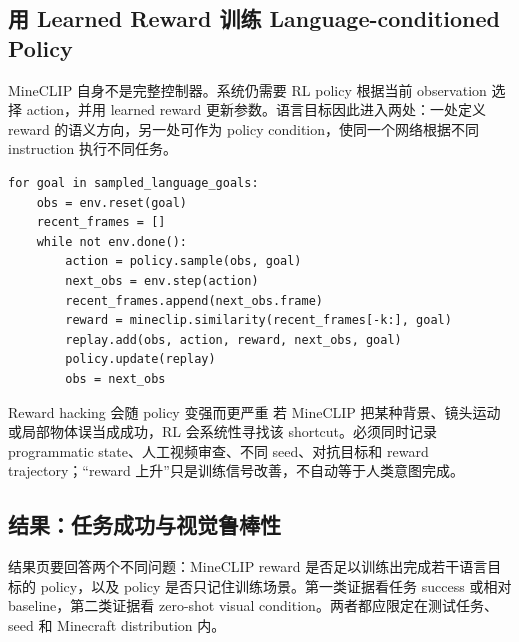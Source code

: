 \subsection{用 Learned Reward 训练 Language-conditioned Policy}

MineCLIP 自身不是完整控制器。系统仍需要 RL policy 根据当前 observation 选择 action，并用 learned reward 更新参数。语言目标因此进入两处：一处定义 reward 的语义方向，另一处可作为 policy condition，使同一个网络根据不同 instruction 执行不同任务。


\begin{lstlisting}[caption={MineCLIP-conditioned RL 训练循环的概念伪代码}]
for goal in sampled_language_goals:
    obs = env.reset(goal)
    recent_frames = []
    while not env.done():
        action = policy.sample(obs, goal)
        next_obs = env.step(action)
        recent_frames.append(next_obs.frame)
        reward = mineclip.similarity(recent_frames[-k:], goal)
        replay.add(obs, action, reward, next_obs, goal)
        policy.update(replay)
        obs = next_obs
\end{lstlisting}

\begin{warningbox}{Reward hacking 会随 policy 变强而更严重}
若 MineCLIP 把某种背景、镜头运动或局部物体误当成成功，RL 会系统性寻找该 shortcut。必须同时记录 programmatic state、人工视频审查、不同 seed、对抗目标和 reward trajectory；“reward 上升”只是训练信号改善，不自动等于人类意图完成。
\end{warningbox}


\subsection{结果：任务成功与视觉鲁棒性}

结果页要回答两个不同问题：MineCLIP reward 是否足以训练出完成若干语言目标的 policy，以及 policy 是否只记住训练场景。第一类证据看任务 success 或相对 baseline，第二类证据看 zero-shot visual condition。两者都应限定在测试任务、seed 和 Minecraft distribution 内。


